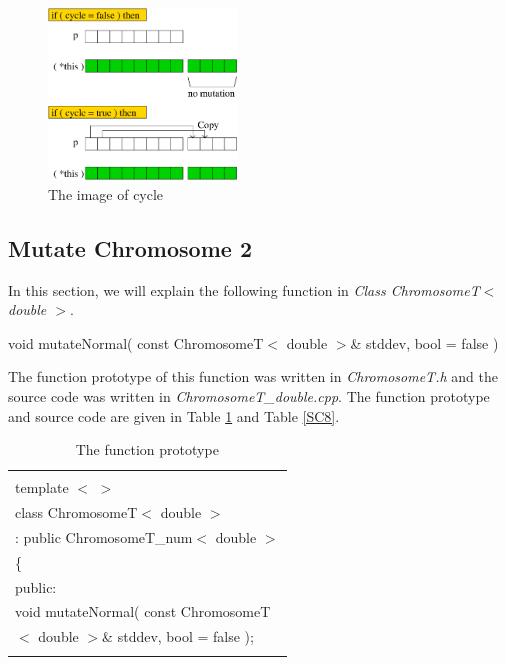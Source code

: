 \documentclass[twocolumn]{article}
\begin{document}
\begin{figure}[h]
\begin{center}
\includegraphics[width=5cm]{mutateUniform2.eps}
\caption{The image of cycle}
\label{Cycle}
\end{center}
\end{figure}

\subsection{Mutate Chromosome 2}

\noindent
In this section, we will explain the following function in {\em Class
ChromosomeT$<$ double $>$}. 

\begin{center}
void mutateNormal( const ChromosomeT$<$ double $>$\& stddev, bool =
false )
\end{center}

\noindent
The function prototype of this function was written in {\em
ChromosomeT.h} and the source code was written in {\em
ChromosomeT\_double.cpp}. The function prototype and source code are
given in Table \ref{FP8} and Table \ref{SC8}.

\begin{table}[h]
\begin{center}
\caption{The function prototype}
\label{FP8}
{\scriptsize
\begin{tabular}{|l|}\hline
\hspace*{7cm}\\
template $<$ $>$\\
class ChromosomeT$<$ double $>$ \\
\hspace*{4mm} : public ChromosomeT\_num$<$ double $>$\\
\{\\
\hspace*{4mm} public:\\
\hspace*{4mm} void mutateNormal( const ChromosomeT \\
\hspace*{8mm} $<$ double $>$\& stddev, bool = false );\\
\hspace*{7cm}\\\hline
\end{tabular}
}
\end{center}
\end{table}
\end{document}
